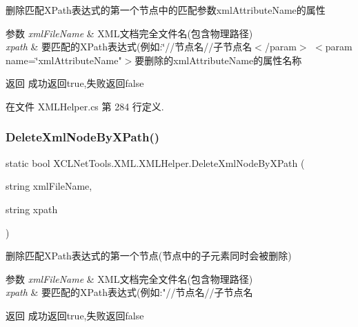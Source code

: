 删除匹配\+X\+Path表达式的第一个节点中的匹配参数xml\+Attribute\+Name的属性 


\begin{DoxyParams}{参数}
{\em xml\+File\+Name} & X\+M\+L文档完全文件名(包含物理路径)\\
\hline
{\em xpath} & 要匹配的\+X\+Path表达式(例如\+:\char`\"{}//节点名//子节点名$<$/param$>$
$<$param name=\char`\"{}xml\+Attribute\+Name"$>$要删除的xml\+Attribute\+Name的属性名称\\
\hline
\end{DoxyParams}
\begin{DoxyReturn}{返回}
成功返回true,失败返回false
\end{DoxyReturn}


在文件 X\+M\+L\+Helper.\+cs 第 284 行定义.

\mbox{\label{class_x_c_l_net_tools_1_1_x_m_l_1_1_x_m_l_helper_a715f1e4b7ef5d9626ca4e1c7bd3ae460}} 
\subsubsection{\texorpdfstring{Delete\+Xml\+Node\+By\+X\+Path()}{DeleteXmlNodeByXPath()}}
{\footnotesize\ttfamily static bool X\+C\+L\+Net\+Tools.\+X\+M\+L.\+X\+M\+L\+Helper.\+Delete\+Xml\+Node\+By\+X\+Path (\begin{DoxyParamCaption}\item[{string}]{xml\+File\+Name,  }\item[{string}]{xpath }\end{DoxyParamCaption})\hspace{0.3cm}{\ttfamily [static]}}



删除匹配\+X\+Path表达式的第一个节点(节点中的子元素同时会被删除) 


\begin{DoxyParams}{参数}
{\em xml\+File\+Name} & X\+M\+L文档完全文件名(包含物理路径)\\
\hline
{\em xpath} & 要匹配的\+X\+Path表达式(例如\+:"//节点名//子节点名\\
\hline
\end{DoxyParams}
\begin{DoxyReturn}{返回}
成功返回true,失败返回false
\end{DoxyReturn}


